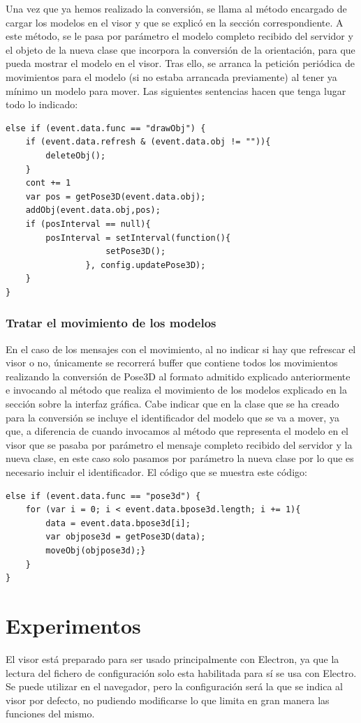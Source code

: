 Una vez que ya hemos realizado la conversión, se llama al método encargado de cargar los modelos en el visor y que se explicó en la sección correspondiente. A este método, se le pasa por parámetro el modelo completo recibido del servidor y el objeto de la nueva clase que incorpora la conversión de la orientación, para que pueda mostrar el modelo en el visor. Tras ello, se arranca la petición periódica de movimientos para el modelo (si no estaba arrancada previamente) al tener ya mínimo un modelo para mover. Las siguientes sentencias hacen que tenga lugar todo lo indicado:

\begin{lstlisting}[frame=single]
else if (event.data.func == "drawObj") {
	if (event.data.refresh & (event.data.obj != "")){
		deleteObj();
	}
	cont += 1
	var pos = getPose3D(event.data.obj);
	addObj(event.data.obj,pos);
	if (posInterval == null){ 
		posInterval = setInterval(function(){
					setPose3D();
				}, config.updatePose3D);
	}
}
\end{lstlisting}

\subsubsection{Tratar el movimiento de los modelos}
En el caso de los mensajes con el movimiento, al no indicar si hay que refrescar el visor o no, únicamente se recorrerá buffer que contiene todos los movimientos realizando la conversión de Pose3D al formato admitido explicado anteriormente e invocando al método que realiza el movimiento de los modelos explicado en la sección sobre la interfaz gráfica. Cabe indicar que en la clase que se ha creado para la conversión se incluye el identificador del modelo que se va a mover, ya que, a diferencia de cuando invocamos al método que representa el modelo en el visor que se pasaba por parámetro el mensaje completo recibido del servidor y la nueva clase, en este caso solo pasamos por parámetro la nueva clase por lo que es necesario incluir el identificador. El código que se muestra este código:

\begin{lstlisting}[frame=single]
else if (event.data.func == "pose3d") {
	for (var i = 0; i < event.data.bpose3d.length; i += 1){
		data = event.data.bpose3d[i];
		var objpose3d = getPose3D(data);
		moveObj(objpose3d);}
	}
}
\end{lstlisting}

\section{Experimentos}
El visor está preparado para ser usado principalmente con Electron, ya que la lectura del fichero de configuración solo esta habilitada para sí se usa con Electro. Se puede utilizar en el navegador, pero la configuración será la que se indica al visor por defecto, no pudiendo modificarse lo que limita en gran manera las funciones del mismo.

